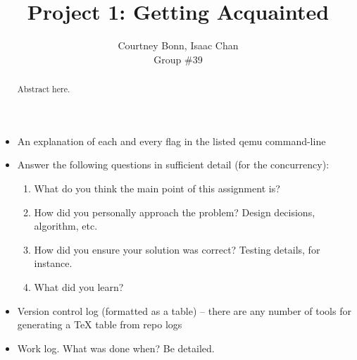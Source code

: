 \documentclass[letterpaper,10pt,draftclsnofoot,onecolumn,titlepage]{IEEEtran}
\def\name{Courtney Bonn, Isaac Chan}
\def\grp{Group \#39}
\begin{document}
\title{Project 1: Getting Acquainted}
\author{\name \\ \grp}

\maketitle

\begin{abstract}
Abstract here.
\end{abstract}

\clearpage


\begin{itemize}

	\item An explanation of each and every flag in the listed qemu command-line
	\item Answer the following questions in sufficient detail (for the concurrency):
    \begin{enumerate}  
		\item What do you think the main point of this assignment is?
		\item How did you personally approach the problem? Design decisions, algorithm, etc.
		\item How did you ensure your solution was correct? Testing details, for instance.
		\item What did you learn?
 	\end{enumerate}
	\item Version control log (formatted as a table) -- there are any number of tools for generating a TeX table from repo logs
	\item Work log. What was done when? Be detailed.
\end{itemize}
\end{document}

